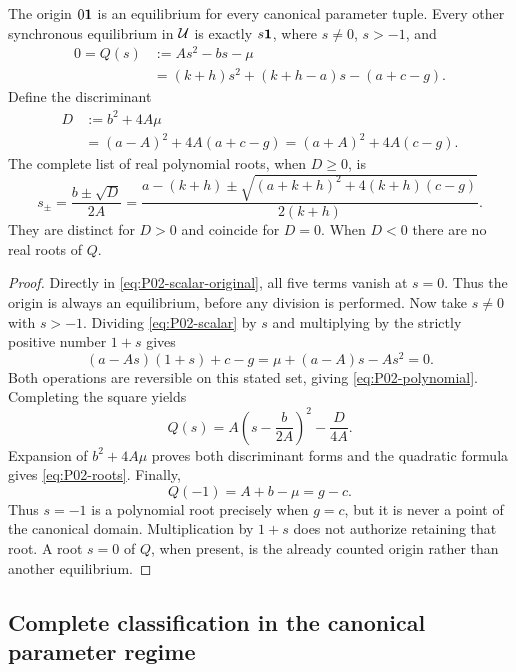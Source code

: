 \begin{proposition}
\label{prop:P02-equation}
The origin $0\mathbf{1}$ is an equilibrium for every canonical parameter
tuple. Every other synchronous equilibrium in $\mathcal{U}$ is exactly
$s\mathbf{1}$, where $s\ne0$, $s>-1$, and
\begin{align}
 0=Q(s)&:=As^2-bs-\mu \label{eq:P02-polynomial}\\
       &=(k+h)s^2+(k+h-a)s-(a+c-g).\nonumber
\end{align}
Define the discriminant
\begin{align}
 D&:=b^2+4A\mu \label{eq:P02-discriminant}\\
  &=(a-A)^2+4A(a+c-g)
   =(a+A)^2+4A(c-g).\nonumber
\end{align}
The complete list of real polynomial roots, when $D\ge0$, is
\begin{equation}
\label{eq:P02-roots}
 s_\pm=\frac{b\pm\sqrt D}{2A}
 =\frac{a-(k+h)\pm
 \sqrt{(a+k+h)^2+4(k+h)(c-g)}}{2(k+h)}.
\end{equation}
They are distinct for $D>0$ and coincide for $D=0$. When $D<0$
there are no real roots of $Q$.
\end{proposition}

\begin{proof}
Directly in \eqref{eq:P02-scalar-original}, all five terms vanish
at $s=0$. Thus the origin is always an equilibrium, before any
division is performed. Now take $s\ne0$ with $s>-1$.
Dividing \eqref{eq:P02-scalar} by $s$ and multiplying by
the strictly positive number $1+s$ gives
\[
 (a-As)(1+s)+c-g=\mu+(a-A)s-As^2=0.
\]
Both operations are reversible on this stated set, giving
\eqref{eq:P02-polynomial}. Completing the square yields
\begin{equation}
\label{eq:P02-square}
 Q(s)=A\left(s-\frac b{2A}\right)^2-\frac D{4A}.
\end{equation}
Expansion of $b^2+4A\mu$ proves both discriminant forms and the
quadratic formula gives \eqref{eq:P02-roots}. Finally,
\begin{equation}
\label{eq:P02-minusone}
 Q(-1)=A+b-\mu=g-c.
\end{equation}
Thus $s=-1$ is a polynomial root precisely when $g=c$, but it is
never a point of the canonical domain. Multiplication by $1+s$
does not authorize retaining that root. A root $s=0$ of $Q$, when
present, is the already counted origin rather than another equilibrium.
\end{proof}

\subsection{Complete classification in the canonical parameter regime}
\label{slot:P02-3}

